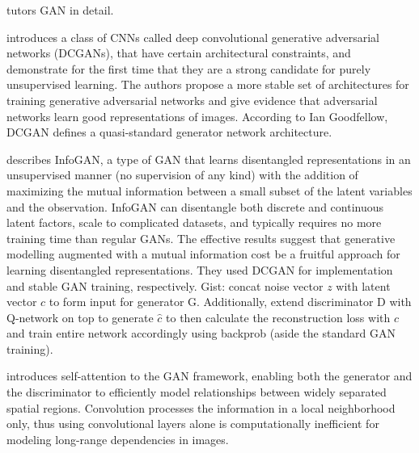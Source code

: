 \documentclass[10pt,letterpaper]{article}
\begin{document}
\par\cite{1701.00160} tutors GAN in detail. 

\par\cite{1511.06434} introduces a class of CNNs called deep convolutional generative adversarial networks (DCGANs), that have certain architectural constraints, and demonstrate for the first time that they are a strong candidate for purely unsupervised learning. The authors propose a more stable set of architectures for training generative adversarial networks and give evidence that adversarial networks learn good representations of images. According to Ian Goodfellow, DCGAN defines a quasi-standard generator network architecture. 

\par\cite{1606.03657} describes InfoGAN, a type of GAN that learns disentangled representations in an unsupervised manner (no supervision of any kind) with the addition of maximizing the mutual information between a small subset of the latent variables and the observation. InfoGAN can disentangle both discrete and continuous latent factors, scale to complicated datasets, and typically requires no more training time than regular GANs.  The effective results suggest that generative modelling augmented with a mutual information cost be a fruitful approach for learning disentangled representations. They used DCGAN for implementation and stable GAN training, respectively. Gist: concat noise vector $z$ with latent vector $c$ to form input for generator G. Additionally, extend discriminator D with Q-network on top to generate $\hat{c}$ to then calculate the reconstruction loss with $c$ and train entire network accordingly using backprob (aside the standard GAN training).

\par \cite{1805.08318} introduces self-attention to the GAN framework, enabling both the generator and the discriminator to efficiently model relationships between widely separated spatial regions. Convolution processes the information in a local neighborhood only, thus using convolutional layers alone is computationally inefficient for modeling long-range dependencies in images.
\end{document}

